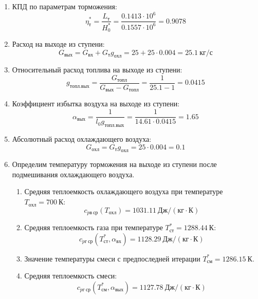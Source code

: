 \documentclass[a4paper,10pt]{article}
\begin{document}
\begin{enumerate}
        \item КПД по параметрам торможения:
        \[
            \eta_т^* = \frac{ L_т }{ H_0^* } =
                \frac{
                    0.1413 \cdot 10^6
                }{
                    0.1557 \cdot 10^6 } =
            0.9078
        \]

        \item Расход на выходе из ступени:
        \[
            G_{вых} = G_{вх} + G_т g_{охл} =
                25 + 25 \cdot
                0.004 =
            25.1 \ кг/с
        \]

        \item Относительный расход топлива на выходе из ступени:
        \[
            g_{топл.вых} = \frac{ G_{топл} }{ G_{вых} - G_{топл} } =
                 \frac{ 1 }{ 25.1 - 1 } =
            0.0415
        \]

        \item Коэффициент избытка воздуха на выходе из ступени:
        \[
            \alpha_{вых} = \frac{ 1 }{ l_0 g_{топл.вых} } =
                \frac{ 1 }{ 14.61 \cdot 0.0415 } =
            1.65
        \]

        \item Абсолютный расход охлаждающего воздуха:
        \[
            G_{охл} = G_т g_{охл} = 25 \cdot 0.004 =
            0.1
        \]

        \item Определим температуру торможения на выходе из ступени после подмешивания охлаждающего воздуха.
        \begin{enumerate}

            \item Средняя теплоемкость охлаждающего воздуха при температуре $T_{охл} = 700\ К $:
            \[
                c_{pв\ ср} (T_{охл}) = 1031.11\ Дж/ (кг \cdot К)
            \]

            \item Средняя теплоемкость газа при температуре $T_{ст}^* = 1288.44 \ К $:
            \[
                c_{pг\ ср} (T_{ст}^*, \alpha_{вх}) =
                1128.29\ Дж/ (кг \cdot К)
            \]

            \item Значение температуры смеси с предпоследней итерации $T_{см}^{*} = 1286.15\ К$.

            \item Средняя теплоемкость смеси:
            \[
                c_{pг\ ср} (T_{см}^{*}, \alpha_{вых}) =
                1127.78\ Дж/ (кг \cdot К)
            \]


\end{enumerate}
\end{enumerate}
\end{document}
